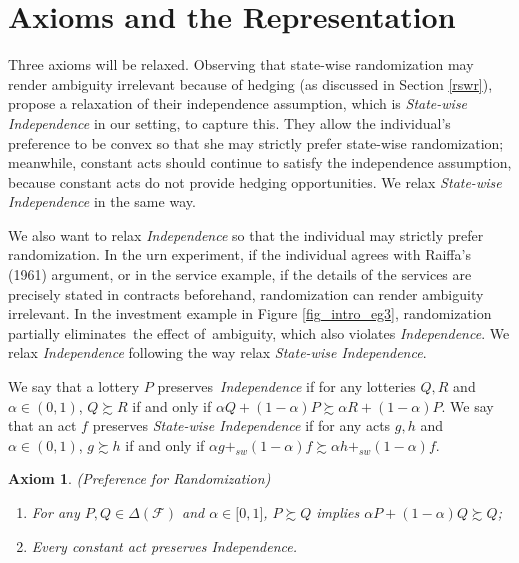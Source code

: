 \documentclass[12pt, notitlepage]{article}
\newtheorem{axiom}{Axiom}
\begin{document}
\section{Axioms and the Representation}

\label{compare}Three axioms will be relaxed. Observing that state-wise
randomization may render ambiguity irrelevant because of hedging (as
discussed in Section \ref{rswr}), \cite{GilboaSchmeidler89} propose a
relaxation of their independence assumption, which is \textit{State-wise
Independence} in our setting, to capture this. They allow the individual's
preference to be convex so that she may strictly prefer state-wise
randomization; meanwhile, constant acts should continue to satisfy the
independence assumption, because constant acts do not provide hedging
opportunities. We relax \textit{State-wise Independence} in the same way.

We also want to relax \textit{Independence} so that the individual may
strictly prefer randomization. In the urn experiment, if the individual
agrees with Raiffa's (1961) argument, or in the service example, if the
details of the services are precisely stated in contracts beforehand,
randomization can render ambiguity irrelevant. In the investment example in
Figure \ref{fig_intro_eg3}, randomization partially eliminates\ the effect
of\ ambiguity, which also violates \textit{Independence}. We relax \textit{%
Independence} following the way \cite{GilboaSchmeidler89} relax \textit{%
State-wise Independence}.

We say that a lottery $P$ preserves\textit{\ Independence} if for any
lotteries $Q,R$ and $\alpha \in (0,1)$, $Q\succsim R$ if and only if $\alpha
Q+(1-\alpha )P\succsim \alpha R+(1-\alpha )P$. We say that an act $f$
preserves \textit{State-wise Independence} if for any acts $g,h$ and $\alpha
\in (0,1)$, $g\succsim h$ if and only if $\alpha g+_{sw}(1-\alpha )f\succsim
\alpha h+_{sw}(1-\alpha )f$.

\begin{axiom}
(Preference for Randomization)

\begin{enumerate}
\item[(i)] For any $P,Q\in \Delta (\mathcal{F})$ and $\alpha \in \lbrack
0,1] $, $P\succsim Q$ implies $\alpha P+(1-\alpha )Q\succsim Q$;

\item[(ii)] Every constant act preserves Independence.
\end{enumerate}
\end{axiom}
\end{document}
